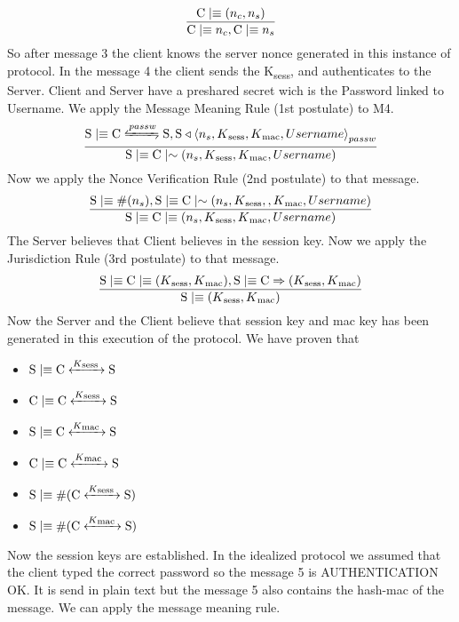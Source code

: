 \[ \frac{\textnormal{C} \mid\equiv (n_c,n_s)}{\textnormal{C} \mid\equiv n_c, \textnormal{C} \mid\equiv n_s}\]
So after message 3 the client knows the server nonce generated in this instance of protocol. In the message 4 the client sends the K\textsubscript{sess}, and authenticates to the Server. Client and Server have a preshared secret wich is the Password linked to Username. We apply the Message Meaning Rule (1st postulate) to M4.
\[ \frac{\textnormal{S} \believes \textnormal{C} \secret{passw} \textnormal{S}, \textnormal{S} \sees \combine{n_s,K\textsubscript{sess},K\textsubscript{mac},Username}{passw}}{\textnormal{S}\believes \textnormal{C} \oncesaid (n_s,K\textsubscript{sess},K\textsubscript{mac},Username)} \]
Now we apply the Nonce Verification Rule (2nd postulate) to that message.
\[ \frac{\textnormal{S}\mid\equiv \#(n_s), \textnormal{S} \mid\equiv \textnormal{C} \mid\sim (n_s,K\textsubscript{sess},,K\textsubscript{mac},Username)}
   {\textnormal{S} \mid\equiv \textnormal{C} \mid\equiv (n_s,K\textsubscript{sess},K\textsubscript{mac},Username)}	\]
The Server believes that Client believes in the session key. Now we apply the Jurisdiction Rule (3rd postulate) to that message.
\[ \frac{\textnormal{S} \mid\equiv \textnormal{C} \mid\equiv (K\textsubscript{sess},K\textsubscript{mac}), \textnormal{S} \mid\equiv \textnormal{C} \Rightarrow (K\textsubscript{sess},K\textsubscript{mac})}
        {\textnormal{S} \mid\equiv (K\textsubscript{sess},K\textsubscript{mac}) } \]
Now the Server and the Client believe that session key and mac key has been generated in this execution of the protocol. We have proven that
\begin{itemize}
	\item \(\textnormal{S} \mid\equiv \textnormal{C} \xleftrightarrow{K\textsubscript{sess }} \textnormal{S}\)
	\item \(\textnormal{C} \mid\equiv \textnormal{C} \xleftrightarrow{K\textsubscript{sess }} \textnormal{S}\)
	\item \(\textnormal{S} \mid\equiv \textnormal{C} \xleftrightarrow{K\textsubscript{mac }} \textnormal{S}\)
	\item \(\textnormal{C} \mid\equiv \textnormal{C} \xleftrightarrow{K\textsubscript{mac }} \textnormal{S}\) 
	\item \(\textnormal{S} \mid\equiv \#(\textnormal{C} \xleftrightarrow{K\textsubscript{sess }} \textnormal{S})\)
	\item \(\textnormal{S} \mid\equiv \#(\textnormal{C} \xleftrightarrow{K\textsubscript{mac }} \textnormal{S})\)
\end{itemize}
Now the session keys are established. In the idealized protocol we assumed that the client typed the correct password so the message 5 is AUTHENTICATION OK. It is send in plain text but the message 5 also contains the hash-mac of the message. We can apply the message meaning rule.
